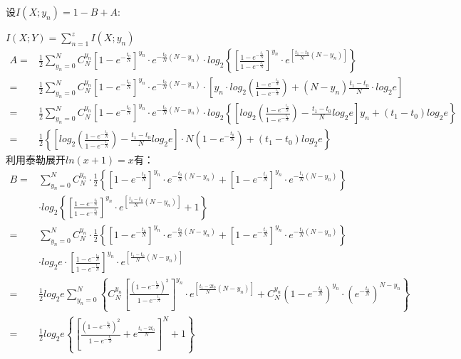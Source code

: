 \documentclass[12pt]{article}
\begin{document}
设$I(X;y_n)=1-B+A$:\par
$I(X;Y)=\sum\limits_{n=1}^zI(X;y_n)$
\begin{equation*}
    \begin{aligned}
       A=&\frac{1}{2}\sum\limits_{y_n=0}^NC_N^{y_n}\left[1-e^{-\frac{t_0}{N}}\right]^{y_n}·e^{-\frac{t_0}{N}(N-y_n)}·log_2\left\{\left[\frac{1-e^{-\frac{t_0}{N}}}{1-e^{-\frac{t_1}{N}}}\right]^{y_n}·e^{[\frac{t_1-t_0}{N}(N-y_n)]}\right\} \\
       =&\frac{1}{2}\sum\limits_{y_n=0}^NC_N^{y_n}\left[1-e^{-\frac{t_0}{N}}\right]^{y_n}·e^{-\frac{t_0}{N}(N-y_n)}·\left[y_n·log_2\left(\frac{1-e^{-\frac{t_0}{N}}}{1-e^{-\frac{t_1}{N}}}\right)+(N-y_n)\frac{t_1-t_0}{N}·log_2e\right] \\
       =&\frac{1}{2}\sum\limits_{y_n=0}^NC_N^{y_n}\left[1-e^{-\frac{t_0}{N}}\right]^{y_n}·e^{-\frac{t_0}{N}(N-y_n)}·log_2\left\{\left[log_2\left(\frac{1-e^{-\frac{t_0}{N}}}{1-e^{-\frac{t_1}{N}}}\right)-\frac{t_1-t_0}{N}log_2e\right]y_n+(t_1-t_0)log_2e\right\} \\
       =&\frac{1}{2}\left\{\left[log_2\left(\frac{1-e^{-\frac{t_0}{N}}}{1-e^{-\frac{t_1}{N}}}\right)-\frac{t_1-t_0}{N}log_2e\right]·N\left(1-e^{-\frac{t_0}{N}}\right)+(t_1-t_0)log_2e\right\}
    \end{aligned}
\end{equation*}
利用泰勒展开$ln(x+1)=x$有：
\begin{equation*}
    \begin{aligned}
       B=&\sum\limits_{y_n=0}^NC_N^{y_n}·\frac{1}{2}\left\{\left[1-e^{-\frac{t_0}{N}}\right]^{y_n}·e^{-\frac{t_0}{N}(N-y_n)}+\left[1-e^{-\frac{t_1}{N}}\right]^{y_n}·e^{-\frac{t_1}{N}(N-y_n)}\right\} \\
       &·log_2\left\{\left[\frac{1-e^{-\frac{t_0}{N}}}{1-e^{-\frac{t_1}{N}}}\right]^{y_n}·e^{[\frac{t_1-t_0}{N}(N-y_n)]}+1\right\} \\
       =&\sum\limits_{y_n=0}^NC_N^{y_n}·\frac{1}{2}\left\{\left[1-e^{-\frac{t_0}{N}}\right]^{y_n}·e^{-\frac{t_0}{N}(N-y_n)}+\left[1-e^{-\frac{t_1}{N}}\right]^{y_n}·e^{-\frac{t_1}{N}(N-y_n)}\right\} \\
       &·log_2e·\left[\frac{1-e^{-\frac{t_0}{N}}}{1-e^{-\frac{t_1}{N}}}\right]^{y_n}·e^{[\frac{t_1-t_0}{N}(N-y_n)]} \\
       =&\frac{1}{2}log_2e\sum\limits_{y_n=0}^N\left\{C_N^{y_n}\left[\frac{(1-e^{-\frac{t_0}{N}})^2}{1-e^{-\frac{t_1}{N}}}\right]^{y_n}·e^{[\frac{t_1-2t_0}{N}(N-y_n)]}+C_N^{y_n}\left(1-e^{-\frac{t_0}{N}}\right)^{y_n}·\left(e^{-\frac{t_0}{N}}\right)^{N-y_n}\right\} \\
       =&\frac{1}{2}log_2e\left\{\left[\frac{(1-e^{-\frac{t_0}{N}})^2}{1-e^{-\frac{t_1}{N}}}+e^{\frac{t_1-2t_0}{N}}\right]^N+1\right\}
    \end{aligned}
\end{equation*}
\end{document}
